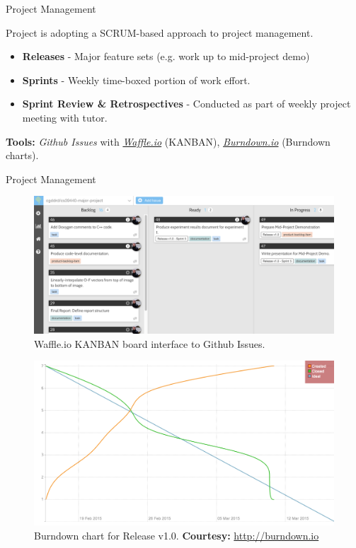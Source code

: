 \documentclass[10pt, compress]{beamer}
\begin{document}
\begin{frame}{Project Management}

Project is adopting a SCRUM-based approach to project management. \\ \vspace{0.2cm}

\begin{itemize}
	\item \textbf{Releases} - Major feature sets (e.g. work up to mid-project demo)
	\item \textbf{Sprints} - Weekly time-boxed portion of work effort.
	\item \textbf{Sprint Review \& Retrospectives} - Conducted as part of weekly project meeting with tutor. 
\end{itemize}


\textbf{Tools:} \textit{Github Issues} with \textit{\href{http://waffle.io}{Waffle.io}} (KANBAN), \textit{\href{http://burndown.io/}{Burndown.io}} (Burndown charts).
	
\end{frame}

\begin{frame}{Project Management}

\begin{figure}[ht!]
\centering
\includegraphics[scale=0.12]{waffle.png}
\caption{Waffle.io KANBAN board interface to Github Issues.}
\end{figure}

\begin{figure}[ht!]
\centering
\includegraphics[scale=0.12]{burndown.png}
\caption{Burndown chart for Release v1.0. \textbf{Courtesy:} \href{http://burndown.io}{http://burndown.io}}
\end{figure}

\end{frame}
\end{document}
